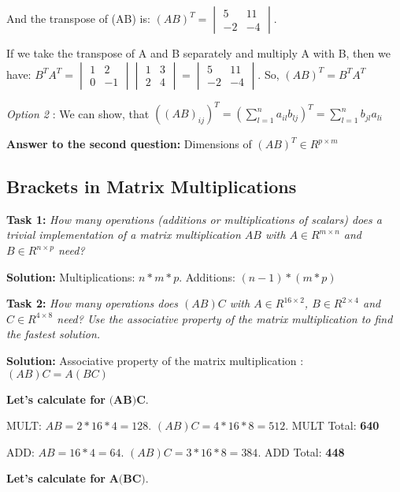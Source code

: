\documentclass{scrartcl}
\begin{document}
And the transpose of (AB) is: $(AB)^T =
\begin{vmatrix}
5 & 11 \\
-2 & -4
\end{vmatrix}$.

If we take the transpose of A and B separately and multiply A with B, then we have:
 $B^T A^T =
\begin{vmatrix}
1 & 2 \\
0 & -1
\end{vmatrix}
\begin{vmatrix}
1 & 3 \\
2 & 4
\end{vmatrix} 
= 
\begin{vmatrix}
5 & 11 \\
-2 & -4
\end{vmatrix}$.
So, $(AB)^T = B^T A^T$

\textit{Option 2} : We can show, that 
$((AB)_{ij})^T = (\sum_{l=1}^{n} a_{il}b_{lj})^T = \sum_{l=1}^{n} b_{jl}a_{li}$

\textbf{Answer to the second question:} Dimensions of $(AB)^T \in R^{p \times m}$

\subsection{Brackets in Matrix Multiplications} 
\textbf{Task 1: } \textit{How many operations (additions or multiplications of scalars) does a trivial implementation of a matrix multiplication $AB$ with $A \in R^{m \times n}$ and $B \in R^{n \times p}$ need?}

\textbf{Solution:} Multiplications: $n * m * p$. Additions: $(n-1) * (m  * p)$

\textbf{Task 2: } \textit{How many operations does $(AB)C$ with $A \in R^{16 \times 2}$, $B \in R^{2 \times 4}$ and $C \in R^{4 \times 8}$ need? Use the associative property of the matrix multiplication to find the fastest solution.}

\textbf{Solution: }  Associative property of the matrix multiplication : $(AB)C = A(BC)$

\textbf{Let's calculate for} \( \textbf{(AB)C}\).

MULT: $AB = 2 * 16 * 4 = 128$. $(AB)C = 4 * 16 * 8 = 512$. MULT Total: \textbf{640}

ADD: $AB = 16 * 4 = 64$. $(AB)C = 3 * 16 * 8 = 384$. ADD Total: \textbf{448}

\textbf{Let's calculate for} \(\textbf{A(BC)} \).
\end{document}
